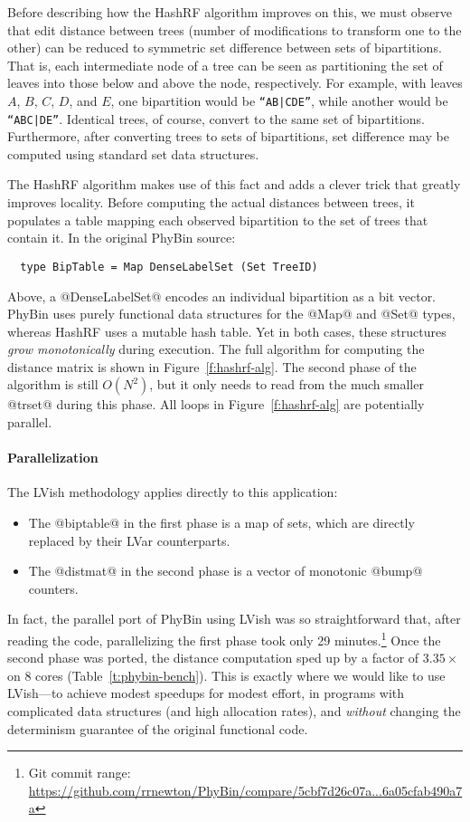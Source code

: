 Before describing how the HashRF algorithm improves on this, we must observe that {edit
  distance} between trees (number of modifications to transform one to the
other) can be reduced to symmetric set difference between sets of bipartitions.
That is, each intermediate node of a tree can be seen as partitioning the set of
leaves into those below and above the node, respectively.  For example, with
leaves $A$, $B$, $C$, $D$, and $E$, one bipartition would be {\tt ``AB|CDE''},
while another would be {\tt ``ABC|DE''}.  Identical trees, of course, convert to the
same set of bipartitions.  Furthermore, after converting trees to sets of
bipartitions, set difference may be computed using standard set data structures.

The HashRF algorithm makes use of this fact and adds a clever trick that greatly improves
locality.  Before computing the actual distances between trees, it populates a
table mapping each observed bipartition to the set of trees that contain it.  In
the original PhyBin source:
%
\begin{lstlisting}
  type BipTable = Map DenseLabelSet (Set TreeID)
\end{lstlisting}
% 
Above, a @DenseLabelSet@ encodes an individual bipartition as a bit
vector.  PhyBin uses purely functional data structures for the @Map@
and @Set@ types, whereas HashRF uses a mutable hash table.  Yet in
both cases, these structures {\em grow monotonically} during
execution.  The full algorithm for computing the distance matrix is 
shown in Figure~\ref{f:hashrf-alg}.
The second phase of the algorithm is still $O(N^2)$, but it only needs
to read from the much smaller @trset@ during this phase.  All loops
in Figure~\ref{f:hashrf-alg} are potentially parallel.


\paragraph{Parallelization}
The LVish methodology applies directly to this application: 
\begin{itemize}
\item The @biptable@ in the first phase is a map of sets, which are
  directly replaced by their LVar counterparts.
\item The @distmat@ in the second phase is a vector of monotonic
      @bump@ counters.
\end{itemize}
In fact, the parallel port of PhyBin using LVish was so straightforward that, after reading the code,
parallelizing the first phase took only 29 minutes.\footnote{Git commit range: \url{https://github.com/rrnewton/PhyBin/compare/5cbf7d26c07a...6a05cfab490a7a}}  Once the second
phase was ported, the distance computation sped up by a factor of $3.35\times$ on 
8 cores (Table~\ref{t:phybin-bench}).
% 
This is exactly where we would like to use LVish---to achieve modest
speedups for modest effort, in programs with complicated data
structures (and high allocation rates), and {\em without} changing the
determinism guarantee of the original functional code.

